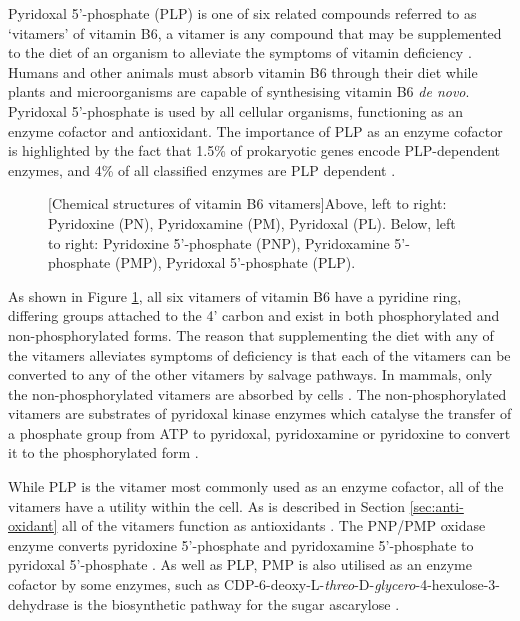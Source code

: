 Pyridoxal 5'-phosphate (PLP) is one of six related compounds referred to as `vitamers' of vitamin B6, a vitamer is any compound that may be supplemented to the diet of an organism to alleviate the symptoms of vitamin deficiency \cite{Burk1943}. Humans and other animals must absorb vitamin B6 through their diet while plants and microorganisms are capable of synthesising vitamin B6 \textit{de novo}. Pyridoxal 5'-phosphate is used by all cellular organisms, functioning as an enzyme cofactor and antioxidant. The importance of PLP as an enzyme cofactor is highlighted by the fact that 1.5\% of prokaryotic genes encode PLP-dependent enzymes, and 4\% of all classified enzymes are PLP dependent \cite{Percudani2003}. \par 
\begin{figure}[!htbp]
\begin{minipage}{\linewidth}

	[Chemical structures of vitamin B6 vitamers]{Above, left to right: Pyridoxine (PN), Pyridoxamine (PM), Pyridoxal (PL). Below, left to right: Pyridoxine 5'-phosphate (PNP), Pyridoxamine 5'-phosphate (PMP), Pyridoxal 5'-phosphate (PLP).\label{fig:vitamers}}	
\end{minipage}
\end{figure}
As shown in Figure \ref{fig:vitamers}, all six vitamers of vitamin B6 have a pyridine ring, differing groups attached to the 4' carbon and exist in both phosphorylated and non-phosphorylated forms. The reason that supplementing the diet with any of the vitamers alleviates symptoms of deficiency is that each of the vitamers can be converted to any of the other vitamers by salvage pathways. In mammals, only the non-phosphorylated vitamers are absorbed by cells \cite{Clayton2006}. The non-phosphorylated vitamers are substrates of pyridoxal kinase enzymes which catalyse the transfer of a phosphate group from ATP to pyridoxal, pyridoxamine or pyridoxine to convert it to the phosphorylated form \cite{diSalvo2004}.%

While PLP is the vitamer most commonly used as an enzyme cofactor, all of the vitamers have a utility within the cell. As is described in Section \ref{sec:anti-oxidant} all of the vitamers function as antioxidants \cite{Bilski2000}. The PNP/PMP oxidase enzyme converts pyridoxine 5'-phosphate and pyridoxamine 5'-phosphate to pyridoxal 5'-phosphate \cite{diSalvo2011,Zhao1995}. As well as PLP, PMP is also utilised as an enzyme cofactor by some enzymes, such as CDP-6-deoxy-L-\textit{threo}-D-\textit{glycero}-4-hexulose-3-dehydrase is the biosynthetic pathway for the sugar ascarylose \cite{Burns1996}.

